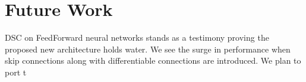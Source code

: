 \documentclass{article}
\begin{document}
\section{Future Work}

DSC on FeedForward neural networks stands as a testimony proving the proposed new architecture holds water. We see the surge in performance when skip connections along with differentiable connections are introduced. We plan to port t


  

\end{document}
